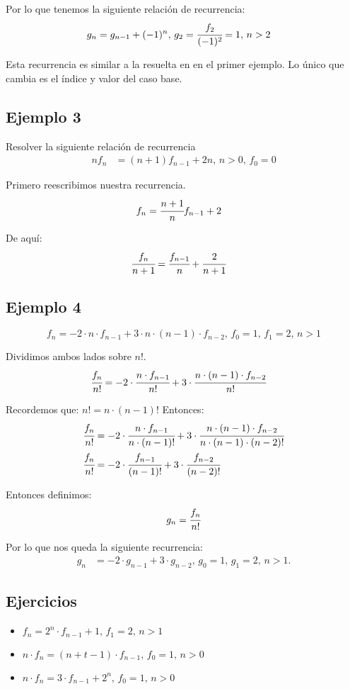 Por lo que tenemos la siguiente relación de recurrencia:
\begin{align*}
g_n&=g_{n-1}+(-1)^n,\,g_2=\cfrac{f_2}{(-1)^2}=1,\,n>2
\end{align*}

Esta recurrencia es similar a la resuelta en en el primer ejemplo. Lo único que cambia es el índice y valor del caso base.

\subsection{Ejemplo 3}
Resolver la siguiente relación de recurrencia
\begin{align*}
nf_n&=(n+1)f_{n-1}+2n,\,n>0,\,f_0=0
\end{align*}

Primero reescribimos nuestra recurrencia.
\begin{align*}
f_n&=\cfrac{n+1}{n}f_{n-1}+2
\end{align*}

De aquí:
\begin{align*}
\cfrac{f_{n}}{n+1}&=\cfrac{f_{n-1}}{n}+\cfrac{2}{n+1}
\end{align*}

\subsection{Ejemplo 4}
$$f_n=-2\cdot n\cdot f_{n-1}+3\cdot n\cdot (n-1)\cdot f_{n-2},\,f_0=1,\,f_1=2,\,n>1 $$

Dividimos ambos lados sobre $n!$.
\begin{align*}
\cfrac{f_n}{n!}&=-2\cdot\cfrac{n\cdot f_{n-1}}{n!}+3\cdot \cfrac{n\cdot (n-1)\cdot f_{n-2}}{n!}
\end{align*}

Recordemos que:
$n!=n\cdot (n-1)!$
Entonces:
\begin{align*}
\cfrac{f_n}{n!}&=-2\cdot\cfrac{n\cdot f_{n-1}}{n\cdot (n-1)!}+3\cdot \cfrac{n\cdot (n-1)\cdot f_{n-2}}{n\cdot (n-1)\cdot (n-2)!}\\
\cfrac{f_n}{n!}&=-2\cdot \cfrac{f_{n-1}}{(n-1)!}+3\cdot \cfrac{f_{n-2}}{(n-2)!}
\end{align*}

Entonces definimos:
$$g_n=\cfrac{f_n}{n!}$$

Por lo que nos queda la siguiente recurrencia:
\begin{align*}
g_n&=-2\cdot g_{n-1}+3\cdot g_{n-2},\,g_0=1,\,g_1=2,\,n>1.
\end{align*}

\subsection{Ejercicios}
\begin{itemize}
\item $f_n=2^n\cdot f_{n-1}+1,\,f_1=2,\,n>1$
\item $n\cdot f_n=(n+t-1)\cdot f_{n-1},\,f_0=1,\,n>0$

\item $n\cdot f_n=3\cdot f_{n-1}+2^n,\,f_0=1,\,n>0$
\end{itemize}
